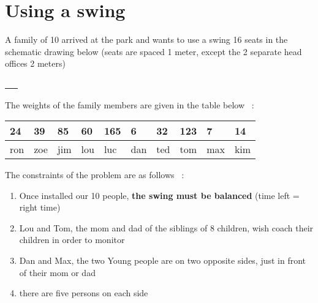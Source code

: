 \chapter{Using a swing}
\label{sec:balancoire}


A family of 10 arrived at the park and wants to use a swing
16 seats in the schematic drawing below (seats are spaced
1 meter, except the 2 separate head offices 2 meters)

\begin{center}
    \underline{
      ~~~ 
    }

\raisebox{2ex}{$\Delta$}
\end{center}
The weights of the family members are given in the table below ~:

\begin{center}
    \begin{tabular}{|l|l|l|l|l|l|l|l|l|l|}
        \hline
        24&39 &85 &60 &165 &6  &32 &123 &7  &14 \\
        \hline
        ron&zoe&jim&lou&luc &dan&ted&tom&max&kim\\
        \hline
    \end{tabular}
\end{center}

The constraints of the problem are as follows ~:
\begin{enumerate}
 \item Once installed our 10 people, \textbf{the swing must be balanced} (time left = right time)
 \item Lou and Tom, the mom and dad of the siblings of 8 children, wish
coach their children in order to monitor
 \item Dan and Max, the two
Young people are on two opposite sides, just in front of their mom or dad
 \item there are five persons on each side
\end{enumerate}

